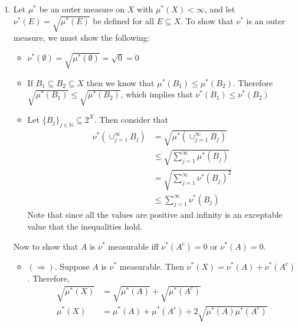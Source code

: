 \documentclass[12pt, letterpaper]{article}
\newcommand{\N}{\mathbb{N}}
\begin{document}
\begin{enumerate}
	since $(\cup_{i=1}^\infty A_i) \cap A_j = \cup_{i=1}^\infty (A_i \cap A_j) =
	A_j$ as if $i \neq j$ then $A_i \cap A_j = \emptyset$ by definition
	and $(\cup_{i=1}^\infty A_i) \cap A_j^c = \cup_{i=1}^\infty (A_i \cap A_j^c) = \cup_{i=1, i \neq j}^\infty A_i)
	$ since for all $i \neq j, A_j^c \cap A_i = A_i$.  Therefore we have by induction 
	that 
	$\mu^*(E \cap ( \bigcup_{i=1}^\infty A_j)) = \sum_{i=1}^n \mu^*(E \cap A_i) + 
	\mu^*(E \cap ( \bigcup_{i=n+1}^\infty A_j))$.  Therefore $mu^*(E \cap ( \bigcup_{i=1}^\infty A_j)) \geq \sum_{i=1}^n \mu^*(E \cap A_i)$.  Since this holds for all $n$, then 
	it holds for the limit.  Therefore we have equality.  
	\item[2] Let $\mu^*$ be an outer measure on $X$ with $\mu^*(X) < \infty$, and let 
	$\nu^*(E) = \sqrt{\mu^*(E)}$ be defined for all $E \subseteq X$.  To show that 
	$\nu^*$ is an outer measure, we must show the following:
	\begin{itemize}
		\item $\nu^*(\emptyset) = \sqrt{\mu^*(\emptyset)} = \sqrt{0} = 0$
		\item If $B_1 \subseteq B_2 \subseteq X$ then we know that $\mu^*(B_1) \leq \mu^*(B_2)$.  Therefore $\sqrt{\mu^*(B_1)} \leq \sqrt{\mu^*(B_2)}$, which implies that
		$\nu^*(B_1) \leq \nu^*(B_2)$
		\item Let $\{B_j\}_{j\in \N} \subseteq 2^X $.  Then consider that 
		\begin{align*}
			\nu^*(\cup_{j=1}^\infty B_j) &= \sqrt{\mu^*(\cup_{j=1}^\infty B_j)}\\
			&\leq \sqrt{\sum_{j=1}^\infty \mu^*( B_j)}\\
			&= \sqrt{\sum_{j=1}^\infty \nu^*( B_j)^2}\\
			&\leq \sum_{j=1}^\infty \nu^*( B_j)
		\end{align*}
		Note that since all the values are positive and infinity is an exceptable value
		that the inequalities hold.
\end{itemize}
	Now to show that $A$ is $\nu^*$ measurable iff $\nu^*(A^c) = 0$ or $\nu^*(A) = 0$.
	\begin{itemize}
		\item $(\Rightarrow)$.  Suppose $A$ is $\nu^*$ measurable.  Then 
		$\nu^*(X) = \nu^*(A) + \nu^*(A^c)$.  Therefore, 
		\begin{align*}
			\sqrt{\mu^*(X)} &= \sqrt{\mu^*(A)} + \sqrt{\mu^*(A^c)}\\
			\mu^*(X) &= \mu^*(A) + \mu^*(A^c) + 2 \sqrt{\mu^*(A)\mu^*(A^c)}\\

\end{align*}
\end{itemize}
\end{enumerate}
\end{document}

